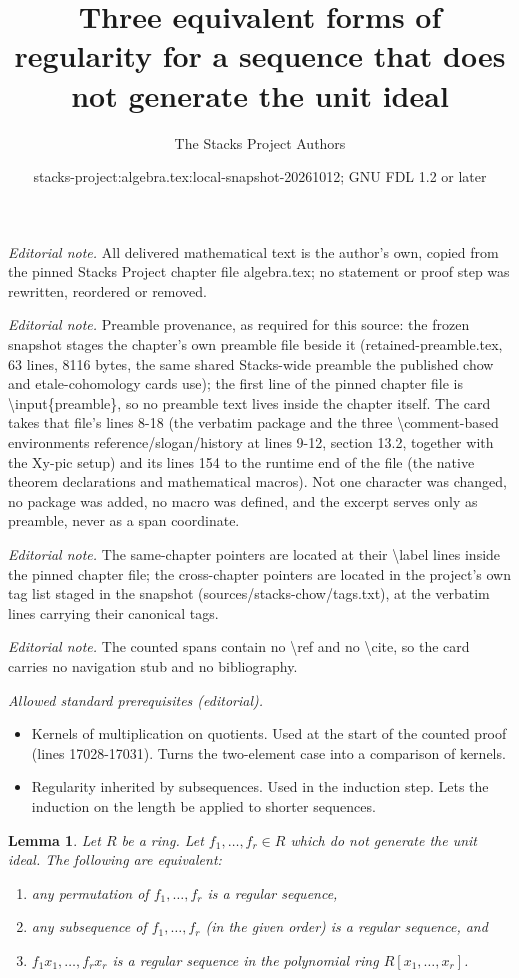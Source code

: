 \documentclass[10pt,a4paper]{amsart}
\title{Three equivalent forms of regularity for a sequence that does not generate the unit ideal}
\author{The Stacks Project Authors}
\date{stacks-project:algebra.tex:local-snapshot-20261012; GNU FDL 1.2 or later}
\theoremstyle{plain}
\newtheorem{lemma}[subsection]{Lemma}
\theoremstyle{definition}
\theoremstyle{remark}
\numberwithin{equation}{subsection}
\begin{document}
\maketitle
\noindent\textit{Editorial note.} All delivered mathematical text is the author's own, copied from the pinned Stacks Project chapter file algebra.tex; no statement or proof step was rewritten, reordered or removed.\par\medskip
\noindent\textit{Editorial note.} Preamble provenance, as required for this source: the frozen snapshot stages the chapter's own preamble file beside it (retained-preamble.tex, 63 lines, 8116 bytes, the same shared Stacks-wide preamble the published chow and etale-cohomology cards use); the first line of the pinned chapter file is \textbackslash{}input\{preamble\}, so no preamble text lives inside the chapter itself. The card takes that file's lines 8-18 (the verbatim package and the three \textbackslash{}comment-based environments reference/slogan/history at lines 9-12, section 13.2, together with the Xy-pic setup) and its lines 154 to the runtime end of the file (the native theorem declarations and mathematical macros). Not one character was changed, no package was added, no macro was defined, and the excerpt serves only as preamble, never as a span coordinate.\par\medskip
\noindent\textit{Editorial note.} The same-chapter pointers are located at their \textbackslash{}label lines inside the pinned chapter file; the cross-chapter pointers are located in the project's own tag list staged in the snapshot (sources/stacks-chow/tags.txt), at the verbatim lines carrying their canonical tags.\par\medskip
\noindent\textit{Editorial note.} The counted spans contain no \textbackslash{}ref and no \textbackslash{}cite, so the card carries no navigation stub and no bibliography.\par\medskip
\noindent\textit{Allowed standard prerequisites (editorial).}\begin{itemize}
\item Kernels of multiplication on quotients. Used at the start of the counted proof (lines 17028-17031). Turns the two-element case into a comparison of kernels.
\item Regularity inherited by subsequences. Used in the induction step. Lets the induction on the length be applied to shorter sequences.
\end{itemize}\medskip
\begin{lemma}
\label{lemma-regular-sequence-in-polynomial-ring}
Let $R$ be a ring. Let $f_1, \ldots, f_r \in R$ which do not generate
the unit ideal. The following are equivalent:
\begin{enumerate}
\item any permutation of $f_1, \ldots, f_r$ is a regular sequence,
\item any subsequence of $f_1, \ldots, f_r$ (in the given order) is
a regular sequence, and
\item $f_1x_1, \ldots, f_rx_r$ is a regular sequence in the polynomial
ring $R[x_1, \ldots, x_r]$.
\end{enumerate}
\end{lemma}
\end{document}
